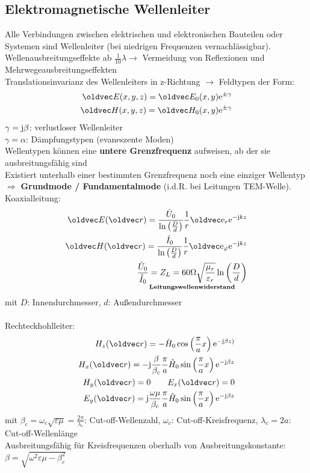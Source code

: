 \documentclass[6pt,a4paper]{scrartcl}
\let\vec\oldvec
\begin{document}
\begin{multicols}{4}
		\subsection{Elektromagnetische Wellenleiter}
	Alle Verbindungen zwischen elektrischen und elektronischen Bauteilen oder Systemen sind Wellenleiter (bei niedrigen Frequenzen vernachlässigbar).\\
	Wellenausbreitungseffekte ab $\frac{1}{10}\lambda \rightarrow$ Vermeidung von Reflexionen und Mehrwegeausbreitungseffekten\\
	Translationsinvarianz des Wellenleiters in z-Richtung $\rightarrow$ Feldtypen der Form:
	\begin{align*}
	 \vec E(x,y,z) = \vec E_0(x,y)\e^{\pm\gamma}\\
	 \vec H(x,y,z) = \vec H_0(x,y)\e^{\pm\gamma}
\end{align*}
	$\gamma = \mathrm{j}\beta$: verlustloser Wellenleiter\\
	$\gamma = \alpha$: Dämpfungstypen (evaneszente Moden)\\
	Wellentypen können eine \textbf{untere Grenzfrequenz} aufweisen, ab der sie ausbreitungsfähig sind\\
	Existiert unterhalb einer bestimmten Grenzfrequenz noch eine einziger Wellentyp $\Rightarrow$ \textbf{Grundmode / Fundamentalmode} (i.d.R. bei Leitungen TEM-Welle).\\
	Koaxialleitung:
	\begin{align*}
	\vec E(\vec r) = \frac{\hat U_0}{\ln\left(\frac{D}{d}\right)}\frac{1}{r}\vec\e_r\e^{-\j kz}\\
	\vec H(\vec r) = \frac{\hat I_0}{\ln\left(\frac{D}{d}\right)}\frac{1}{r}\vec\e_\varphi\e^{-\j kz}\\
	\underset{\textbf{Leitungswellenwiderstand}}{\frac{\hat U_0}{\hat I_0} = Z_L = 60\Omega\sqrt{\frac{\mu_r}{\varepsilon_r}}\ln\left(\frac{D}{d}\right)}
	\end{align*}
	mit $D$: Innendurchmesser, $d$: Außendurchmesser\\ \\
	
	Rechteckhohlleiter:
	\begin{align*}
	H_z(\vec r) = -\hat H_0\cos\left(\frac{\pi}{a}x\right)\e^{-\j\beta z)}\\
	H_x(\vec r) = -\j \frac{\beta}{\beta_c}\frac{\pi}{a}\hat H_0\sin\left(\frac{\pi}{a}x\right)\e^{-\j\beta z}\\
	H_y(\vec r) = 0\qquad E_x(\vec r) = 0\\	
	E_y(\vec r) = \j \frac{\omega\mu}{\beta_c}\frac{\pi}{a}\hat H_0\sin\left(\frac{\pi}{a}x\right)\e^{-\j\beta z}
	\end{align*}
	mit $\beta_c = \omega_c\sqrt{\varepsilon\mu} = \frac{2\pi}{\lambda_c}$: Cut-off-Wellenzahl, $\omega_c$: Cut-off-Kreisfrequenz, $\lambda_c = 2a$: Cut-off-Wellenlänge\\
	Ausbreitungsfähig für Kreisfrequenzen oberhalb von Ausbreitungskonstante: $\beta = \sqrt{\omega^2\varepsilon\mu-\beta_c^2}$
	

\end{multicols}
\end{document}
